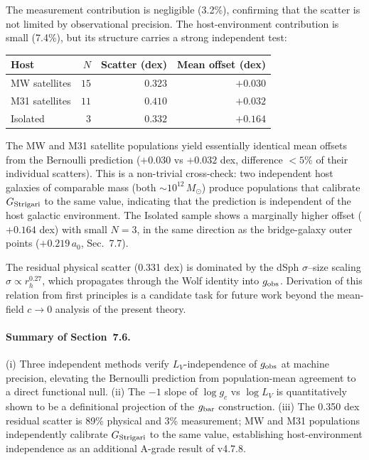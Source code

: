 \documentclass[11pt,a4paper]{article}
\newcommand{\gobs}{g_{\rm obs}}
\newcommand{\gbar}{g_{\rm bar}}
\newcommand{\gc}{g_{c}}
\newcommand{\ao}{a_{0}}
\newcommand{\rh}{r_{h}}
\newcommand{\LV}{L_{V}}
\newcommand{\Gstr}{G_{\rm Strigari}}
\begin{document}
The measurement contribution is negligible (3.2\%), confirming that the scatter is not limited by
observational precision. The host-environment contribution is small (7.4\%), but its structure carries a
strong independent test:

\begin{center}\small
\begin{tabular}{@{}lrrr@{}}
\toprule
Host & $N$ & Scatter (dex) & Mean offset (dex) \\
\midrule
MW satellites & $15$ & $0.323$ & $+0.030$ \\
M31 satellites & $11$ & $0.410$ & $+0.032$ \\
Isolated & $3$ & $0.332$ & $+0.164$ \\
\bottomrule
\end{tabular}
\end{center}

The MW and M31 satellite populations yield essentially identical mean offsets from the Bernoulli prediction
($+0.030$ vs $+0.032$ dex, difference $< 5\%$ of their individual scatters). This is a non-trivial
cross-check: two independent host galaxies of comparable mass (both $\sim 10^{12}\,M_\odot$) produce
populations that calibrate $\Gstr$ to the same value, indicating that the prediction is independent of the
host galactic environment. The Isolated sample shows a marginally higher offset ($+0.164$ dex) with small
$N = 3$, in the same direction as the bridge-galaxy outer points ($+0.219\,\ao$, Sec.~7.7).

The residual physical scatter (0.331 dex) is dominated by the dSph $\sigma$--size scaling $\sigma \propto
\rh^{0.27}$, which propagates through the Wolf identity into $\gobs$. Derivation of this relation from first
principles is a candidate task for future work beyond the mean-field $c \to 0$ analysis of the present theory.

\paragraph{Summary of Section~7.6.}
(i) Three independent methods verify $\LV$-independence of $\gobs$ at machine precision, elevating the
Bernoulli prediction from population-mean agreement to a direct functional null. (ii) The $-1$ slope of
$\log\gc$ vs $\log\LV$ is quantitatively shown to be a definitional projection of the $\gbar$ construction.
(iii) The 0.350 dex residual scatter is 89\% physical and 3\% measurement; MW and M31 populations
independently calibrate $\Gstr$ to the same value, establishing host-environment independence as an
additional A-grade result of v4.7.8.
\end{document}
